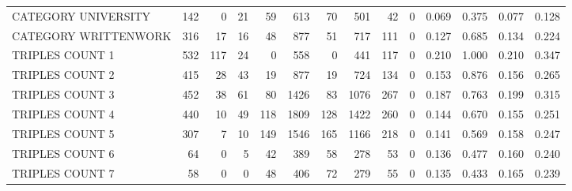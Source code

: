 \begin{tabular}{lrrrrrrrrrllll}
 CATEGORY UNIVERSITY      &             142 &             0 &              21 &              59 &             613 &   70 &  501 &   42 &    0 & 0.069 & 0.375 & 0.077 & 0.128 \\
 CATEGORY WRITTENWORK     &             316 &            17 &              16 &              48 &             877 &   51 &  717 &  111 &    0 & 0.127 & 0.685 & 0.134 & 0.224 \\
 TRIPLES COUNT 1          &             532 &           117 &              24 &               0 &             558 &    0 &  441 &  117 &    0 & 0.210 & 1.000 & 0.210 & 0.347 \\
 TRIPLES COUNT 2          &             415 &            28 &              43 &              19 &             877 &   19 &  724 &  134 &    0 & 0.153 & 0.876 & 0.156 & 0.265 \\
 TRIPLES COUNT 3          &             452 &            38 &              61 &              80 &            1426 &   83 & 1076 &  267 &    0 & 0.187 & 0.763 & 0.199 & 0.315 \\
 TRIPLES COUNT 4          &             440 &            10 &              49 &             118 &            1809 &  128 & 1422 &  260 &    0 & 0.144 & 0.670 & 0.155 & 0.251 \\
 TRIPLES COUNT 5          &             307 &             7 &              10 &             149 &            1546 &  165 & 1166 &  218 &    0 & 0.141 & 0.569 & 0.158 & 0.247 \\
 TRIPLES COUNT 6          &              64 &             0 &               5 &              42 &             389 &   58 &  278 &   53 &    0 & 0.136 & 0.477 & 0.160 & 0.240 \\
 TRIPLES COUNT 7          &              58 &             0 &               0 &              48 &             406 &   72 &  279 &   55 &    0 & 0.135 & 0.433 & 0.165 & 0.239 \\
\hline
\end{tabular}
